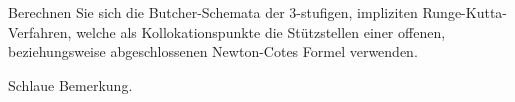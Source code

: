 \begin{exercise}
Berechnen Sie sich die Butcher-Schemata der 3-stufigen, impliziten Runge-Kutta-Verfahren,
welche als Kollokationspunkte die Stützstellen einer offenen, beziehungsweise
abgeschlossenen Newton-Cotes Formel verwenden.
\end{exercise}
\begin{solution}
Schlaue Bemerkung.
\end{solution}

